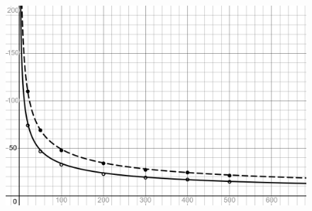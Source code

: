 \begin{figure}[h!]
	\hspace{-2em}
	\includegraphics[width=\linewidth]{graphics/desmos-graph.png}
\end{figure}

